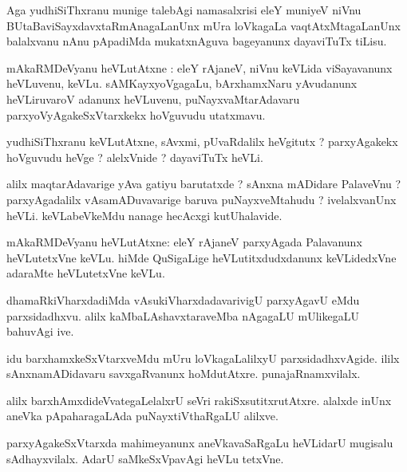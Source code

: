 \documentclass{article}
\begin{document}
\begin{mn}
Aga yudhiSiThxranu munige talebAgi namasalxrisi eleY muniyeV niVnu BUtaBaviSayxdavxtaRmAnagaLanUnx 
mUra loVkagaLa vaqtAtxMtagaLanUnx balalxvanu nAnu pApadiMda mukatxnAguva bageyanunx dayaviTuTx 
tiLisu.
\end{mn}

\begin{mn}
mAkaRMDeVyanu heVLutAtxne : eleY rAjaneV, niVnu keVLida viSayavanunx heVLuvenu, keVLu. 
sAMKayxyoVgagaLu, bArxhamxNaru yAvudanunx heVLiruvaroV adanunx heVLuvenu, puNayxvaMtarAdavaru
parxyoVyAgakeSxVtarxkekx hoVguvudu utatxmavu.
\end{mn}


\begin{mn}
yudhiSiThxranu keVLutAtxne, sAvxmi, pUvaRdalilx heVgitutx ? parxyAgakekx hoVguvudu heVge ? 
alelxVnide ? dayaviTuTx heVLi.
\end{mn}

\begin{mn}
alilx maqtarAdavarige yAva gatiyu barutatxde ? sAnxna mADidare PalaveVnu ? parxyAgadalilx 
vAsamADuvavarige baruva puNayxveMtahudu ? ivelalxvanUnx heVLi. keVLabeVkeMdu nanage hecAcxgi 
kutUhalavide.
\end{mn}

\begin{mn}
mAkaRMDeVyanu heVLutAtxne: eleY rAjaneV parxyAgada Palavanunx heVLutetxVne keVLu. hiMde QuSigaLige 
heVLutitxdudxdanunx keVLidedxVne adaraMte heVLutetxVne keVLu.
\end{mn}

\begin{mn}
dhamaRkiVharxdadiMda vAsukiVharxdadavarivigU parxyAgavU eMdu parxsidadhxvu. alilx 
kaMbaLAshavxtaraveMba nAgagaLU mUlikegaLU bahuvAgi ive.
\end{mn}

\begin{mn}
idu barxhamxkeSxVtarxveMdu mUru  loVkagaLalilxyU parxsidadhxvAgide. ililx sAnxnamADidavaru 
savxgaRvanunx hoMdutAtxre. punajaRnamxvilalx.
\end{mn}

\begin{mn}
alilx barxhAmxdideVvategaLelalxrU seVri rakiSxsutitxrutAtxre. alalxde inUnx aneVka pApaharagaLAda 
puNayxtiVthaRgaLU alilxve.
\end{mn}

\begin{mn}
parxyAgakeSxVtarxda mahimeyanunx aneVkavaSaRgaLu heVLidarU mugisalu sAdhayxvilalx. AdarU 
saMkeSxVpavAgi heVLu tetxVne.
\end{mn}
\end{document}
